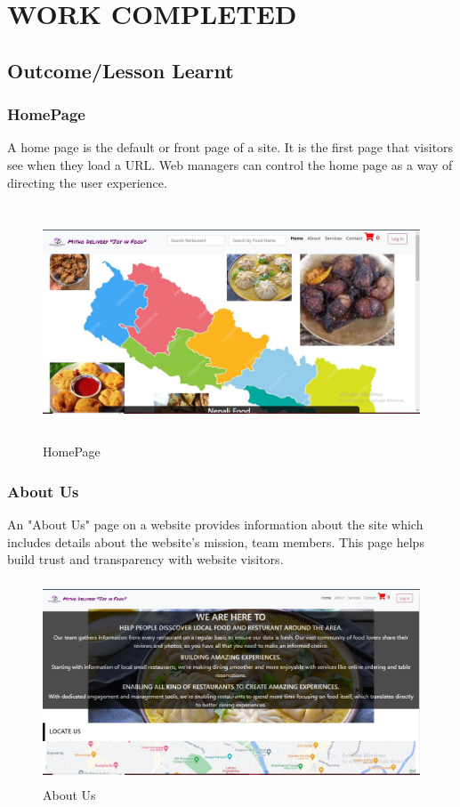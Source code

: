 \chapter{WORK COMPLETED}
\section{Outcome/Lesson Learnt}
\subsection{HomePage}
A home page is the default or front page of a site. It is the first page that visitors see when they load a URL. Web managers can control the home page as a way of directing the user experience.
\begin{figure}[h]
    \centering
    \includegraphics[height=7cm]{img/Graphics/home ui.JPG}
    \caption{HomePage}
\end{figure}

\subsection{About Us}
An "About Us" page on a website provides information about the site which includes details about the website's mission, team members. This page helps build trust and transparency with website visitors.
\begin{figure}[h]
    \centering
    \includegraphics[height=6cm]{img/Graphics/about ui.JPG}
    \caption{About Us}
\end{figure}

